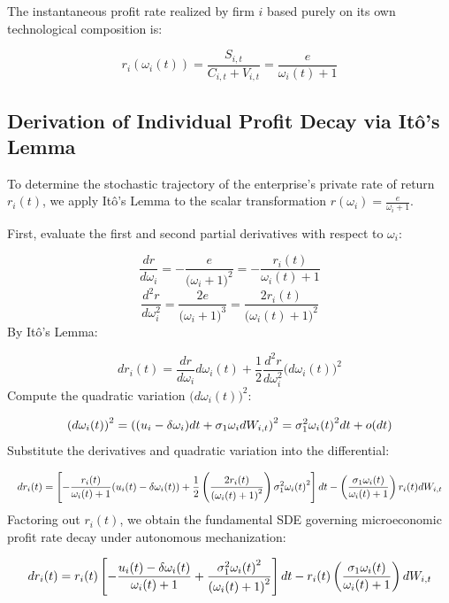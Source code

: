 \documentclass[11pt,letterpaper]{report}
\newcommand{\fitmath}[1]{\begingroup\setbox0=\hbox{$\displaystyle #1$}\ifdim\wd0>\linewidth\resizebox{\linewidth}{!}{$\displaystyle #1$}\else\displaystyle #1\fi\endgroup}
\begin{document}
The instantaneous profit rate realized by firm $i$ based purely on its own technological composition is:

\[
{r}_{i}({\omega }_{i}(t))=\frac{{S}_{i,t}}{{C}_{i,t}+{V}_{i,t}}=\frac{e}{{\omega }_{i}(t)+1}
\]
\subsection{Derivation of Individual Profit Decay via Itô's Lemma}
To determine the stochastic trajectory of the enterprise's private rate of return ${r}_{i}(t)$, we apply Itô's Lemma to the scalar transformation $r({\omega }_{i})=\frac{e}{{\omega }_{i}+1}$.

First, evaluate the first and second partial derivatives with respect to ${\omega }_{i}$:

\[
\frac{dr}{d{\omega }_{i}}=-\frac{e}{({\omega }_{i}+1{)}^{2}}=-\frac{{r}_{i}(t)}{{\omega }_{i}(t)+1}
\]
\[
\frac{{d}^{2}r}{d{\omega }_{i}^{2}}=\frac{2e}{({\omega }_{i}+1{)}^{3}}=\frac{2{r}_{i}(t)}{({\omega }_{i}(t)+1{)}^{2}}
\]
By Itô's Lemma:

\[
d{r}_{i}(t)=\frac{dr}{d{\omega }_{i}}d{\omega }_{i}(t)+\frac{1}{2}\frac{{d}^{2}r}{d{\omega }_{i}^{2}}(d{\omega }_{i}(t){)}^{2}
\]
Compute the quadratic variation $(d{\omega }_{i}(t){)}^{2}$:

\[\fitmath{(d{\omega }_{i}(t){)}^{2}={\left({({u}_{i}-\delta {\omega }_{i})dt+{\sigma }_{1}{\omega }_{i}d{W}_{i,t}}\right)}^{2}={\sigma }_{1}^{2}{\omega }_{i}(t{)}^{2}dt+o(dt)}\]
Substitute the derivatives and quadratic variation into the differential:

\[\fitmath{d{r}_{i}(t)=\left[{-\frac{{r}_{i}(t)}{{\omega }_{i}(t)+1}({u}_{i}(t)-\delta {\omega }_{i}(t))+\frac{1}{2}\left({\frac{2{r}_{i}(t)}{({\omega }_{i}(t)+1{)}^{2}}}\right){\sigma }_{1}^{2}{\omega }_{i}(t{)}^{2}}\right]dt-\left({\frac{{\sigma }_{1}{\omega }_{i}(t)}{{\omega }_{i}(t)+1}}\right){r}_{i}(t)d{W}_{i,t}}\]
Factoring out ${r}_{i}(t)$, we obtain the fundamental SDE governing microeconomic profit rate decay under autonomous mechanization:

\[\fitmath{d{r}_{i}(t)={r}_{i}(t)\left[{-\frac{{u}_{i}(t)-\delta {\omega }_{i}(t)}{{\omega }_{i}(t)+1}+\frac{{\sigma }_{1}^{2}{\omega }_{i}(t{)}^{2}}{({\omega }_{i}(t)+1{)}^{2}}}\right]dt-{r}_{i}(t)\left({\frac{{\sigma }_{1}{\omega }_{i}(t)}{{\omega }_{i}(t)+1}}\right)d{W}_{i,t}}\]
\end{document}
